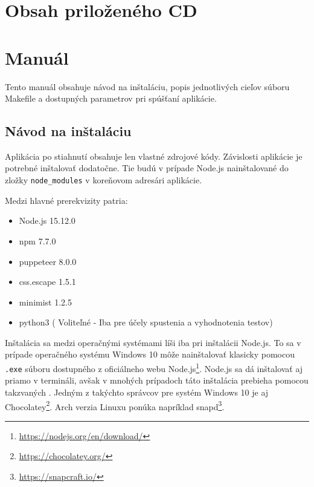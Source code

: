 \chapter{Obsah priloženého CD}


\chapter{Manuál}
\label{manual}

Tento manuál obsahuje návod na inštaláciu, popis jednotlivých cieľov súboru Makefile a dostupných parametrov pri spúšťaní aplikácie.

\section{Návod na inštaláciu}

Aplikácia po stiahnutí obsahuje len vlastné zdrojové kódy. Závislosti aplikácie je potrebné inštalovať dodatočne. Tie budú v prípade Node.js nainštalované do zložky \texttt{node\_modules} v koreňovom adresári aplikácie.

Medzi hlavné prerekvizity patria:

\begin{itemize}
    \item Node.js 15.12.0
    \item npm 7.7.0
    \item puppeteer 8.0.0
    \item css.escape 1.5.1
    \item minimist 1.2.5
    \item python3 ( Voliteľné - Iba pre účely spustenia a vyhodnotenia testov)
\end{itemize}

Inštalácia sa medzi operačnými systémami líši iba pri inštalácii Node.js. To sa v prípade operačného systému Windows 10 môže nainštalovať klasicky pomocou \texttt{.exe} súboru dostupného z oficiálneho webu Node.js\footnote{\url{https://nodejs.org/en/download/}}. Node.js sa dá inštalovať aj priamo v termináli, avšak v mnohých prípadoch táto inštalácia prebieha pomocou takzvaných . Jedným z takýchto správcov pre systém Windows 10 je aj Chocolatey\footnote{\url{https://chocolatey.org/}}. Arch verzia Linuxu ponúka napríklad snapd\footnote{\url{https://snapcraft.io/}}. 

